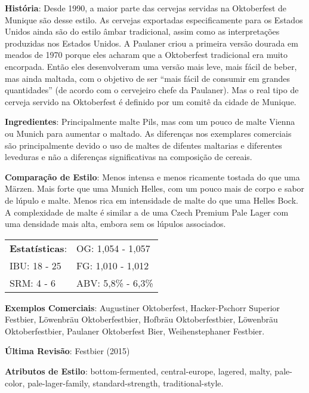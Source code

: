 \textbf{História}: Desde 1990, a maior parte das cervejas servidas na Oktoberfest de Munique são desse estilo. As cervejas exportadas especificamente para os Estados Unidos ainda são do estilo âmbar tradicional, assim como as interpretações produzidas nos Estados Unidos. A Paulaner criou a primeira versão dourada em meados de 1970 porque eles acharam que a Oktoberfest tradicional era muito encorpada. Então eles desenvolveram uma versão mais leve, mais fácil de beber, mas ainda maltada, com o objetivo de ser “mais fácil de consumir em grandes quantidades” (de acordo com o cervejeiro chefe da Paulaner). Mas o real tipo de cerveja servido na Oktoberfest é definido por um comitê da cidade de Munique.

\textbf{Ingredientes}: Principalmente malte Pils, mas com um pouco de malte Vienna ou Munich para aumentar o maltado. As diferenças nos exemplares comerciais são principalmente devido o uso de maltes de difentes maltarias e diferentes leveduras e não a diferenças significativas na composição de cereais.

\textbf{Comparação de Estilo}: Menos intensa e menos ricamente tostada do que uma Märzen. Mais forte que uma Munich Helles, com um pouco mais de corpo e sabor de lúpulo e malte. Menos rica em intensidade de malte do que uma Helles Bock. A complexidade de malte é similar a de uma Czech Premium Pale Lager com uma densidade mais alta, embora sem os lúpulos associados.

\begin{tabular}{@{}p{35mm}p{35mm}@{}}
  \textbf{Estatísticas}: & OG: 1,054 - 1,057 \\
  IBU: 18 - 25  & FG: 1,010 - 1,012  \\
  SRM: 4 - 6   & ABV: 5,8\% - 6,3\%
\end{tabular}

\textbf{Exemplos Comerciais}: Augustiner Oktoberfest, Hacker-Pschorr Superior Festbier, Löwenbräu Oktoberfestbier, Hofbräu Oktoberfestbier, Löwenbräu Oktoberfestbier, Paulaner Oktoberfest Bier, Weihenstephaner Festbier.

\textbf{Última Revisão}: Festbier (2015)

\textbf{Atributos de Estilo}: bottom-fermented, central-europe, lagered, malty, pale-color, pale-lager-family, standard-strength, traditional-style.